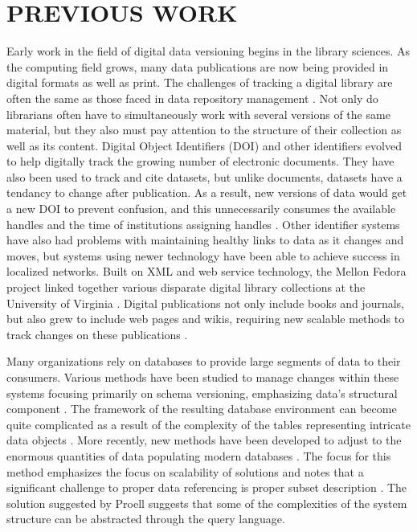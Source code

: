 
\chapter{PREVIOUS WORK}
Early work in the field of digital data versioning begins in the library sciences.
As the computing field grows, many data publications are now being provided in digital formats as well as print.
The challenges of tracking a digital library are often the same as those faced in data repository management \cite{Wiil:2000:RDH:338407.338517}.
Not only do librarians often have to simultaneously work with several versions of the same material, but they also must pay attention to the structure of their collection as well as its content.
Digital Object Identifiers (DOI) and other identifiers evolved to help digitally track the growing number of electronic documents.
They have also been used to track and cite datasets, but unlike documents, datasets have a tendancy to change after publication.
As a result, new versions of data would get a new DOI to prevent confusion, and this unnecessarily consumes the available handles and the time of institutions assigning handles \cite{Lyons2005}.
Other identifier systems have also had problems with maintaining healthy links to data as it changes and moves, but systems using newer technology have been able to achieve success in localized networks.
Built on XML and web service technology, the Mellon Fedora project linked together various disparate digital library collections at the University of Virginia  \cite{Payette2002}.
Digital publications not only include books and journals, but also grew to include web pages and wikis, requiring new scalable methods to track changes on these publications \cite{Berberich:2007:TMT:1277741.1277831}.

Many organizations rely on databases to provide large segments of data to their consumers.
Various methods have been studied to manage changes within these systems focusing primarily on schema versioning, emphasizing data's structural component \cite{roddick1996model}.
The framework of the resulting database environment can become quite complicated as a result of the complexity of the tables representing intricate data objects \cite{Klahold:1986:GMV:645913.671314}.
More recently, new methods have been developed to adjust to the enormous quantities of data populating modern databases \cite{Proell2013} \cite{DBLP:conf/data/2013}.
The focus for this method emphasizes the focus on scalability of solutions and notes that a significant challenge to proper data referencing is proper subset description \cite{proellBigData}.
The solution suggested by Proell suggests that some of the complexities of the system structure can be abstracted through the query language.

